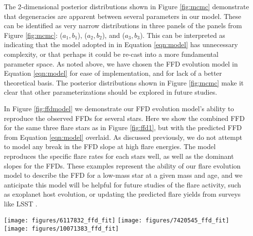 \documentclass[preprint2]{aastex62}
\begin{document}
The 2-dimensional posterior distributions shown in Figure \ref{fig:mcmc} demonstrate that degeneracies are apparent between several parameters in our model. These can be identified as very narrow distributions in three panels of the panels from Figure \ref{fig:mcmc}: ($a_1, b_1$), ($a_2, b_2$), and ($a_3, b_3$). This can be interpreted as indicating that the model adopted in in Equation \ref{eqn:model} has unnecessary complexity, or that perhaps it could be re-cast into a more fundamental parameter space. As noted above, we have chosen the FFD evolution model in Equation \ref{eqn:model} for ease of implementation, and for lack of a better theoretical basis. The posterior distributions shown in Figure \ref{fig:mcmc} make it clear that other parameterizations should be explored in future studies.



In Figure \ref{fig:ffdmodel} we demonstrate our FFD evolution model's ability to reproduce the observed FFDs for several stars. Here we show the combined FFD for the same three flare stars as in Figure \ref{fig:ffd1}, but with the predicted FFD from Equation \ref{eqn:model} overlaid. As discussed previously, we do not attempt to model any break in the FFD slope at high flare energies. The model reproduces the specific flare rates for each stars well, as well as the dominant slopes for the FFDs. These examples represent the ability of our flare evolution model to describe the FFD for a low-mass star at a given mass and age, and we anticipate this model will be helpful for future studies of the flare activity, such as exoplanet host evolution, or updating the predicted flare yields from surveys like LSST \citep{najita2016}.



\begin{figure*}[!t]
\centering
\texttt{[image: figures/6117832\_ffd\_fit]}
\texttt{[image: figures/7420545\_ffd\_fit]}
\texttt{[image: figures/10071383\_ffd\_fit]}
\caption{
Flare frequency distributions as shown from Figure \ref{fig:ffd1} (black line), but with the final flare activity model from Equation \ref{eqn:model} evaluated for each star's mass and age (red line). Note this model was not fit for each star's FFD individually, but instead was fit to our entire sample.}
\label{fig:ffdmodel}
\end{figure*}
\end{document}

